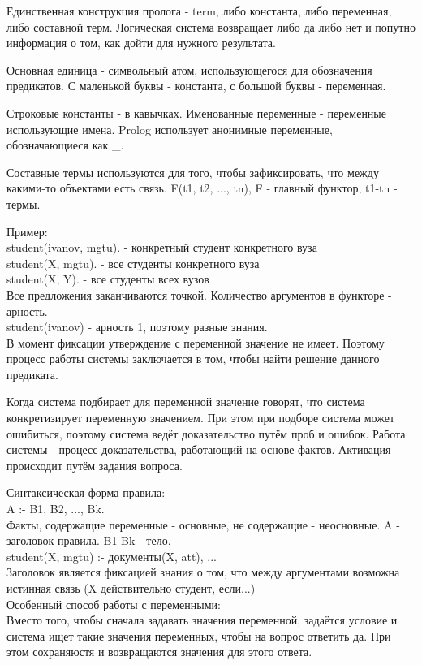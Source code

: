 Единственная конструкция пролога - term, либо константа, либо переменная, либо составной терм. Логическая система возвращает либо да либо нет и попутно информация о том, как дойти для нужного результата.

Основная единица - символьный атом, использующегося для обозначения предикатов. С маленькой буквы - константа, с большой буквы - переменная.

Строковые константы - в кавычках. Именованные переменные - переменные использующие имена. Prolog использует анонимные переменные, обозначающиеся как \_.

Составные термы используются для того, чтобы зафиксировать, что между какими-то объектами есть связь. F(t1, t2, ..., tn), F - главный функтор, t1-tn - термы.

Пример:\\
student(ivanov, mgtu). - конкретный студент конкретного вуза\\
student(X, mgtu). - все студенты конкретного вуза\\
student(X, Y). - все студенты всех вузов\\

Все предложения заканчиваются точкой. Количество аргументов в функторе - арность.\\
student(ivanov) - арность 1, поэтому разные знания.\\

В момент фиксации утверждение с переменной значение не имеет. Поэтому процесс работы системы заключается в том, чтобы найти решение данного предиката.

Когда система подбирает для переменной значение говорят, что система конкретизирует переменную значением. При этом при подборе система может ошибиться, поэтому система ведёт доказательство путём проб и ошибок. Работа системы - процесс доказательства, работающий на основе фактов. Активация происходит путём задания вопроса.

Синтаксическая форма правила:\\
A :- B1, B2, ..., Bk.\\ 
Факты, содержащие переменные - основные, не содержащие - неосновные. A - заголовок правила. B1-Bk - тело.\\
student(X, mgtu) :- документы(X, att), ...\\
Заголовок является фиксацией знания о том, что между аргументами возможна истинная связь (X действительно студент, если...)\\

Особенный способ работы с переменными:\\
Вместо того, чтобы сначала задавать значения переменной, задаётся условие и система ищет такие значения переменных, чтобы на вопрос ответить да. При этом сохраняюстя и возвращаются значения для этого ответа.

